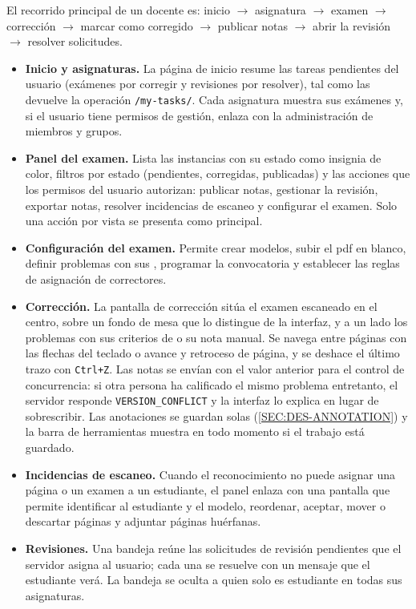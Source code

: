 El recorrido principal de un docente es: inicio $\rightarrow$ asignatura $\rightarrow$
examen $\rightarrow$ corrección $\rightarrow$ marcar como corregido $\rightarrow$ publicar
notas $\rightarrow$ abrir la revisión $\rightarrow$ resolver solicitudes.
\begin{itemize}
  \item \textbf{Inicio y asignaturas.} La página de inicio resume las tareas pendientes
        del usuario (exámenes por corregir y revisiones por resolver), tal como las
        devuelve la operación \texttt{/my-tasks/}. Cada asignatura muestra sus exámenes y, si el usuario
        tiene permisos de gestión, enlaza con la administración de miembros y grupos.
  \item \textbf{Panel del examen.} Lista las instancias con su estado como insignia de
        color, filtros por estado (pendientes, corregidas, publicadas) y las acciones que
        los permisos del usuario autorizan: publicar notas, gestionar la revisión, exportar
        notas, resolver incidencias de escaneo y configurar el examen. Solo una acción por
        vista se presenta como principal.
  \item \textbf{Configuración del examen.} Permite crear modelos, subir el \acs{pdf} en
        blanco, definir problemas con sus , programar la convocatoria y
        establecer las reglas de asignación de correctores.
  \item \textbf{Corrección.} La pantalla de corrección sitúa el examen escaneado en el
        centro, sobre un fondo de mesa que lo distingue de la interfaz, y a un lado los
        problemas con sus criterios de  o su nota manual. Se navega entre
        páginas con las flechas del teclado o avance y retroceso de página, y se deshace el
        último trazo con \texttt{Ctrl+Z}. Las notas se envían con el valor anterior para el
        control de concurrencia: si otra persona ha calificado el mismo problema entretanto,
        el servidor responde \texttt{VERSION\_CONFLICT} y la interfaz lo explica en lugar de
        sobrescribir. Las anotaciones se guardan solas (\cref{SEC:DES-ANNOTATION}) y la
        barra de herramientas muestra en todo momento si el trabajo está guardado.
  \item \textbf{Incidencias de escaneo.} Cuando el reconocimiento no puede asignar una
        página o un examen a un estudiante, el panel enlaza con una pantalla que permite
        identificar al estudiante y el modelo, reordenar, aceptar, mover o descartar
        páginas y adjuntar páginas huérfanas.
  \item \textbf{Revisiones.} Una bandeja reúne las solicitudes de revisión pendientes que
        el servidor asigna al usuario; cada una se resuelve con un mensaje que el estudiante
        verá. La bandeja se oculta a quien solo es estudiante en todas sus asignaturas.
\end{itemize}

